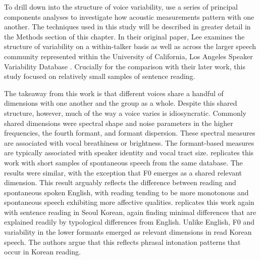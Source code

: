To drill down into the structure of voice variability, \citet{lee_2019_acoustic} use a series of principal components analyses to investigate how acoustic measurements pattern with one another. The techniques used in this study will be described in greater detail in the Methods section of this chapter. In their original paper, Lee examines the structure of variability on a within-talker basis as well as across the larger speech community represented within the University of California, Los Angeles Speaker Variability Database \citep{keating_2019_database}. Crucially for the comparison with their later work, this study focused on relatively small samples of sentence reading. 

The takeaway from this work is that different voices share a handful of dimensions with one another and the group as a whole. Despite this shared structure, however, much of the way a voice varies is idiosyncratic. Commonly shared dimensions were spectral shape and noise parameters in the higher frequencies, the fourth formant, and formant dispersion. These spectral measures are associated with vocal breathiness or brightness. The formant-based measures are typically associated with speaker identity and vocal tract size. \citet{lee_2019_spontaneous} replicates this work with short samples of spontaneous speech from the same database. The results were similar, with the exception that F0 emerges as a shared relevant dimension. This result arguably reflects the difference between reading and spontaneous spoken English, with reading tending to be more monotonous and spontaneous speech exhibiting more affective qualities. \citet{lee_2020_language} replicates this work again with sentence reading in Seoul Korean, again finding minimal differences that are explained readily by typological differences from English. Unlike English, F0 and variability in the lower formants emerged as relevant dimensions in read Korean speech. The authors argue that this reflects phrasal intonation patterns that occur in Korean reading. 

